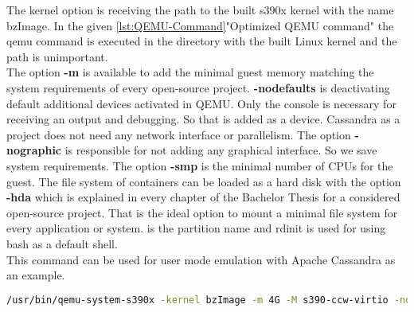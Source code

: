 The kernel option is receiving the path to the built s390x kernel with the name bzImage. In the given \ref{lst:QEMU-Command}"Optimized QEMU command" the qemu command is executed in the directory with the built Linux kernel and the path is unimportant. \\ 
The option \textbf{-m} is available to add the minimal guest memory matching the system requirements of every open-source project. 
\textbf{-nodefaults} is deactivating default additional devices activated in QEMU. 
Only the console is necessary for receiving an output and debugging. 
So that is added as a device. Cassandra as a project does not need any network interface or parallelism. The 
option \textbf{-nographic} is responsible for not adding any graphical interface. 
So we save system requirements. The option \textbf{-smp} is the minimal number of CPUs for the guest. 
The file system of containers can be loaded as a hard disk with the option \textbf{-hda} which is explained in every chapter of the Bachelor Thesis for a considered open-source project. 
That is the ideal option to mount a minimal file system for every application or system. 
 is the partition name and rdinit is used for using bash as a default shell. \\
This command can be used for user mode emulation with Apache Cassandra as an example.


\begin{lstlisting}[language=bash,caption={Optimized QEMU Command},captionpos=b,label={lst:QEMU-Command}]
/usr/bin/qemu-system-s390x -kernel bzImage -m 4G -M s390-ccw-virtio -nodefaults -device sclpconsole,chardev=console -parallel none -net none -chardev stdio,id=console,signal=off,mux=on -mon chardev=console -nographic -smp 3 -hda /data/cassandra.img --append 'root=/dev/vda rw console=ttyS0 rdinit=/bin/bash'
\end{lstlisting}

